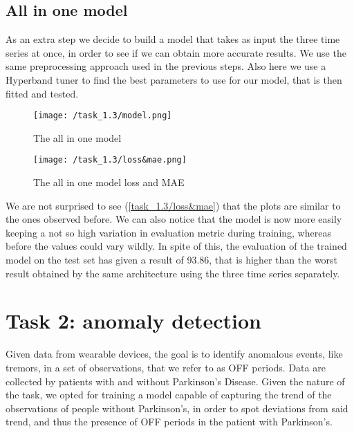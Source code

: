 \documentclass[12pt,a4paper,leqno]{article}
\begin{document}
	\subsection{All in one model}
	As an extra step we decide to build a model that takes as input the three time series at once, in order to see if we can obtain more accurate results. We use the same preprocessing approach used in the previous steps. Also here we use a Hyperband tuner to find the best parameters to use for our model, that is then fitted and tested.
	\begin{figure}
		\centering
		\texttt{[image: /task\_1.3/model.png]}
		\caption{The all in one model}
		\label{task_1.3/model}
	\end{figure}
	\begin{figure}
		\centering
		\texttt{[image: /task\_1.3/loss\&mae.png]}
		\caption{The all in one model loss and MAE}
		\label{task_1.3/loss&mae}
	\end{figure}
	
	We are not surprised to see (\autoref{task_1.3/loss&mae}) that the plots are similar to the ones observed before. We can also notice that the model is now more easily keeping a not so high variation in evaluation metric during training, whereas before the values could vary wildly. In spite of this, the evaluation of the trained model on the test set has given a result of 93.86, that is higher than the worst result obtained by the same architecture using the three time series separately.
	
	\newpage
	
	\section{Task 2: anomaly detection}
	Given data from wearable devices, the goal is to identify anomalous events, like tremors, in a set of observations, that we refer to as OFF periods. Data are collected by patients with and without Parkinson’s Disease. Given the nature of the task, we opted for training a model capable of capturing the trend of the observations of people without Parkinson’s, in order to spot deviations from said trend, and thus the presence of OFF periods in the patient with Parkinson’s.
	
\end{document}

